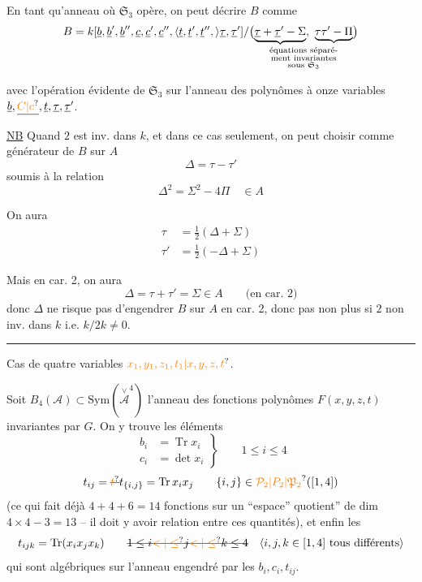 En  tant qu'anneau où $\mathfrak S_3$ opère, on peut décrire $B$ comme
\[
 B=k[\underline b,\underline b',\underline b'',\underline c,\underline c',\underline c'',\inserted{\underline t,\underline t',\underline t'',}\underline\tau,\underline\tau']/
 \bigl(\underset{\substack{\text{équations séparé-}\\\text{ment invariantes}\\\text{sous }\mathfrak S_3}}{\underbrace{\underline\tau+\underline\tau'-\Sigma},\ \underbrace{\tau\tau'-\Pi}}\bigr)
\]

avec l'opération évidente de $\mathfrak S_3$ sur l'anneau des polynômes à onze variables $\underline b,\underline{\unsure{C|c}},\underline t,\underline\tau,\underline\tau'$.

\uline{NB} Quand $2$ est inv. dans $k$, et dans ce
cas seulement, on peut choisir comme générateur de $B$ sur $A$
\[
 \Delta=\tau-\tau'
\]
soumis à la relation
\[
 \Delta^2=\Sigma^2-4\Pi\quad\in A
\]

On aura
\[
 \begin{aligned}
 \tau&=\tfrac12(\Delta+\Sigma)\\
 \tau'&=\tfrac12(-\Delta+\Sigma)
 \end{aligned}
\]

Mais en car. 2, on aura
\[
 \Delta=\tau+\tau'=\Sigma\in A\qquad\text{(en car. 2)}
\]
donc $\Delta$ ne risque pas d'engendrer $B$ sur $A$ en car. 2, donc pas non plus si $2$ non inv. dans $k$ i.e. $k/2k\ne0$.

\begin{center}\rule{2.4cm}{0.3pt}\end{center}

Cas de quatre variables $\unsure{x_1,y_1,z_1,t_1|x,y,z,t}$.

Soit $B_4(\mathcal A)\subset\mathrm{Sym}(\overset{\vee}{\mathcal A}^{4})$ l'anneau des fonctions polynômes $F(x,y,z,t)$
invariantes par $G$. On y trouve les éléments
\[
 \left.\begin{aligned}
 b_i&=\operatorname{Tr}x_i\\
 c_i&=\det x_i
 \end{aligned}\right\}\qquad1\leq i\leq4
\]
\[
 t_{ij}=\deleted{\unsure{t}}t_{\{i,j\}}=\operatorname{Tr}x_ix_j\qquad\{i,j\}\in\unsure{\mathcal P_2|P_2|\mathfrak P_2}([1,4])
\]
(ce qui fait déjà $4+4+6=14$ fonctions sur un ``espace'' quotient'' de dim $4\times4-3=13$ -- il doit y avoir   relation entre ces quantités), et enfin les
\[
 t_{ijk}=\operatorname{Tr}(x_ix_jx_k)\qquad
 \deleted{1\leq i\unsure{<|\leq}j\unsure{<|\leq}k\leq4}\quad
 \inserted{i,j,k\in[1,4]\ \text{tous différents}}
\]
qui sont algébriques sur l'anneau engendré par les $b_i,c_i,t_{ij}$.

